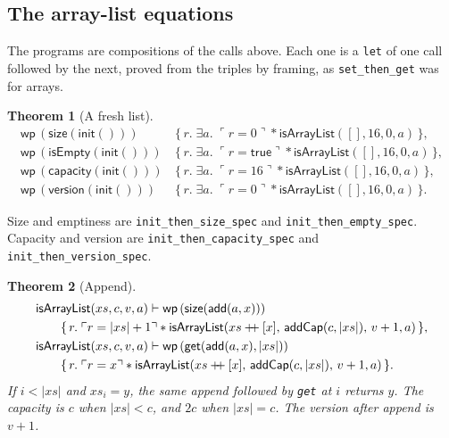\documentclass[11pt]{article}
\newtheorem{theorem}{Theorem}
\newcommand{\True}{\mathsf{true}}
\newcommand{\sep}{\mathbin{*}}
\newcommand{\Wpre}{\mathsf{wp}}
\newcommand{\pure}[1]{\ulcorner #1 \urcorner}
\begin{document}
\subsection{The array-list equations}

The programs are compositions of the calls above.
Each one is a \texttt{let} of one call followed by the next, proved from the triples by framing, as \texttt{set\_then\_get} was for arrays.

\begin{theorem}[A fresh list]
\[
\begin{aligned}
\Wpre\,(\mathsf{size}(\mathsf{init}()))
&\,\{\,r.\; \exists a.\; \pure{r = 0} \sep \mathsf{isArrayList}([], 16, 0, a)\,\},\\
\Wpre\,(\mathsf{isEmpty}(\mathsf{init}()))
&\,\{\,r.\; \exists a.\; \pure{r = \True} \sep \mathsf{isArrayList}([], 16, 0, a)\,\},\\
\Wpre\,(\mathsf{capacity}(\mathsf{init}()))
&\,\{\,r.\; \exists a.\; \pure{r = 16} \sep \mathsf{isArrayList}([], 16, 0, a)\,\},\\
\Wpre\,(\mathsf{version}(\mathsf{init}()))
&\,\{\,r.\; \exists a.\; \pure{r = 0} \sep \mathsf{isArrayList}([], 16, 0, a)\,\}.
\end{aligned}
\]
\end{theorem}

Size and emptiness are \texttt{init\_then\_size\_spec} and \texttt{init\_then\_empty\_spec}.
Capacity and version are \texttt{init\_then\_capacity\_spec} and \texttt{init\_then\_version\_spec}.

\begin{theorem}[Append]
\[
\begin{aligned}
&\mathsf{isArrayList}(xs, c, v, a) \vdash
  \Wpre\,(\mathsf{size}(\mathsf{add}(a, x)))\\
&\qquad \{\,r.\; \pure{r = \lvert xs \rvert + 1} \sep
  \mathsf{isArrayList}(xs \mathbin{+\mkern-6mu+} [x],\,
    \mathsf{addCap}(c, \lvert xs \rvert),\, v+1, a)\,\},\\
&\mathsf{isArrayList}(xs, c, v, a) \vdash
  \Wpre\,(\mathsf{get}(\mathsf{add}(a, x), \lvert xs \rvert))\\
&\qquad \{\,r.\; \pure{r = x} \sep
  \mathsf{isArrayList}(xs \mathbin{+\mkern-6mu+} [x],\,
    \mathsf{addCap}(c, \lvert xs \rvert),\, v+1, a)\,\}.
\end{aligned}
\]
If \(i < \lvert xs \rvert\) and \(xs_i = y\), the same append followed by \texttt{get} at \(i\) returns \(y\).
The capacity is \(c\) when \(\lvert xs \rvert < c\), and \(2c\) when \(\lvert xs \rvert = c\).
The version after append is \(v+1\).
\end{theorem}
\end{document}
